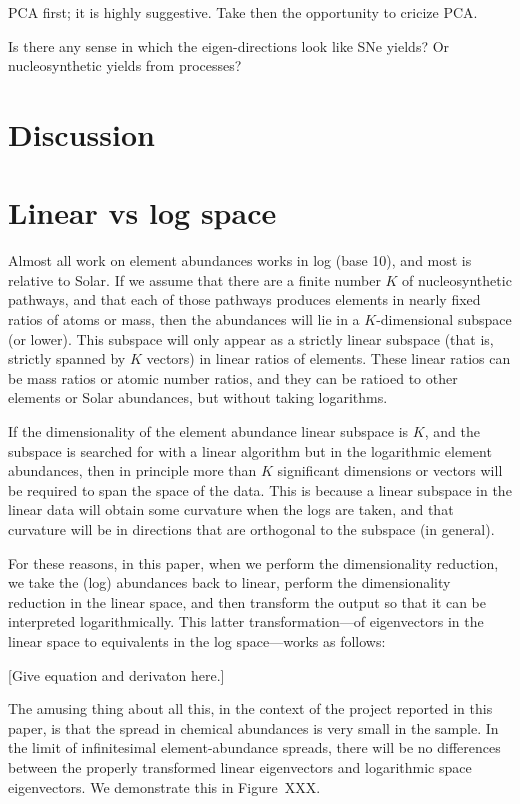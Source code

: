 \documentclass[letterpaper, modern]{aastex62}
\begin{document}
PCA first; it is highly suggestive. Take then the opportunity to cricize PCA.

Is there any sense in which the eigen-directions look like SNe yields?
Or nucleosynthetic yields from processes?

\section{Discussion}

\appendix
\section{Linear vs log space}

Almost all work on element abundances works in log (base 10), and most is
relative to Solar.
If we assume that there are a finite number $K$ of nucleosynthetic pathways,
and that each of those pathways produces elements in nearly fixed
ratios of atoms or mass, then the abundances will lie in a $K$-dimensional
subspace (or lower).
This subspace will only appear as a strictly linear subspace (that is, strictly
spanned by $K$ vectors) in linear ratios of elements.
These linear ratios can be mass ratios or atomic number ratios, and they can be ratioed
to other elements or Solar abundances, but without taking logarithms.

If the dimensionality of the element abundance linear subspace is $K$, and the
subspace is searched for with a linear algorithm but in the logarithmic element
abundances, then in principle more than $K$ significant dimensions or vectors
will be required to span the space of the data.
This is because a linear subspace in the linear data will obtain some curvature
when the logs are taken, and that curvature will be in directions that are orthogonal
to the subspace (in general).

For these reasons, in this paper, when we perform the dimensionality reduction,
we take the (log) abundances back to linear, perform the dimensionality reduction
in the linear space, and then transform the output so that it can be interpreted
logarithmically.
This latter transformation---of eigenvectors in the linear space to equivalents
in the log space---works as follows:

[Give equation and derivaton here.]

The amusing thing about all this, in the context of the project reported in this paper,
is that the spread in chemical abundances is very small in the sample.
In the limit of infinitesimal element-abundance spreads, there will be no differences
between the properly transformed linear eigenvectors and logarithmic space eigenvectors.
We demonstrate this in Figure~XXX.
\end{document}
